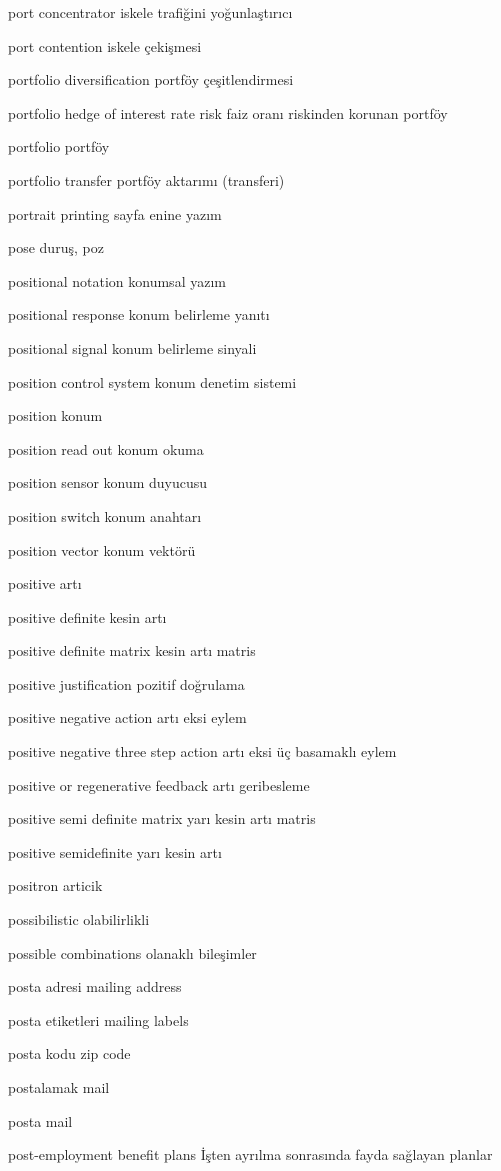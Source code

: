 \documentclass[12pt,fleqn]{article}\usepackage{../../common}
\begin{document}
port concentrator iskele trafiğini yoğunlaştırıcı

port contention iskele çekişmesi

portfolio diversification  portföy çeşitlendirmesi

portfolio hedge of interest rate risk faiz oranı riskinden korunan portföy

portfolio portföy

portfolio transfer portföy aktarımı (transferi)

portrait printing sayfa enine yazım

pose duruş, poz

positional notation konumsal yazım

positional response konum belirleme yanıtı

positional signal konum belirleme sinyali

position control system konum denetim sistemi

position konum

position read out konum okuma

position sensor konum duyucusu

position switch konum anahtarı

position vector konum vektörü

positive artı

positive definite kesin artı

positive definite matrix kesin artı matris

positive justification pozitif doğrulama

positive negative action artı eksi eylem

positive negative three step action artı eksi üç basamaklı eylem

positive or regenerative feedback artı geribesleme

positive semi definite matrix yarı kesin artı matris

positive semidefinite yarı kesin artı

positron articik

possibilistic olabilirlikli

possible combinations olanaklı bileşimler

posta adresi mailing address

posta etiketleri mailing labels

posta kodu zip code

postalamak mail

posta mail

post-employment benefit plans İşten ayrılma sonrasında fayda sağlayan planlar
\end{document}
